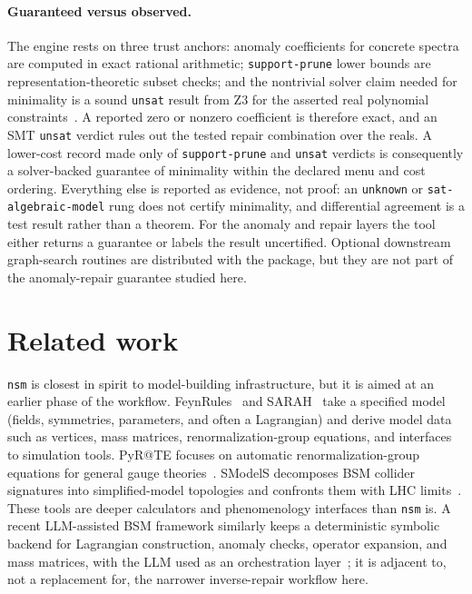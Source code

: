 \documentclass[11pt]{article}
\newcommand{\nsm}{\texttt{nsm}}
\begin{document}
\paragraph{Guaranteed versus observed.}
The engine rests on three trust anchors: anomaly coefficients for concrete
spectra are computed in exact rational arithmetic; \texttt{support-prune} lower bounds
are representation-theoretic subset checks; and the nontrivial solver claim
needed for minimality is a sound \texttt{unsat} result from Z3 for the asserted
real polynomial constraints~\cite{z3,nlsat}. A reported zero or nonzero
coefficient is therefore exact, and an SMT \texttt{unsat} verdict rules out the
tested repair combination over the reals. A lower-cost record made
only of \texttt{support-prune} and \texttt{unsat} verdicts is consequently a
solver-backed guarantee of minimality within the declared menu and cost
ordering. Everything else is reported as evidence, not proof: an
\texttt{unknown} or \texttt{sat-algebraic-model} rung does not certify
minimality, and differential agreement is a test result rather than a theorem.
For the anomaly and repair layers the tool either returns a guarantee or labels
the result uncertified. Optional downstream graph-search routines are
distributed with the package, but they are not part of the anomaly-repair
guarantee studied here.

\section{Related work}

\nsm{} is closest in spirit to model-building infrastructure, but it is aimed at
an earlier phase of the workflow. FeynRules~\cite{feynrules2} and
SARAH~\cite{sarah4} take a specified model (fields, symmetries, parameters, and
often a Lagrangian) and derive model data such as vertices, mass matrices,
renormalization-group equations, and interfaces to simulation tools. PyR@TE
focuses on automatic renormalization-group equations for general gauge
theories~\cite{pyrate}. SModelS decomposes BSM collider signatures into
simplified-model topologies and confronts them with LHC limits~\cite{smodels}.
These tools are deeper calculators and phenomenology interfaces than \nsm{} is.
A recent LLM-assisted BSM framework similarly keeps a deterministic symbolic
backend for Lagrangian construction, anomaly checks, operator expansion, and mass
matrices, with the LLM used as an orchestration layer~\cite{bsmagent}; it is
adjacent to, not a replacement for, the narrower inverse-repair workflow here.
\end{document}

